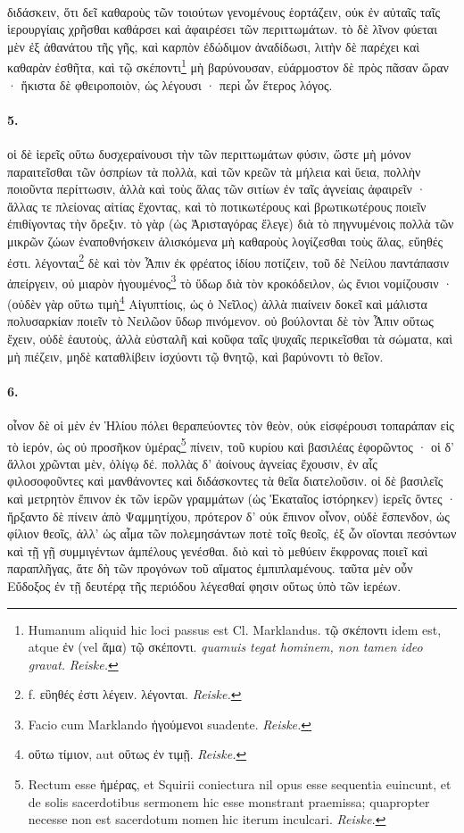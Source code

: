 \documentclass[a4paper, 11pt, oneside, polutonikogreek, german]{article}
\begin{document}
\paragraph{}
διδάσκειν, ὅτι δεῖ καθαροὺς τῶν τοιούτων γενομένους ἑορτάζειν, οὐκ ἐν αὐταῖς ταῖς ἱερουργίαις χρῆσθαι καθάρσει καὶ ἀφαιρέσει τῶν περιττωμάτων. τὸ δὲ λῖνον φύεται μὲν ἐξ ἀθανάτου τῆς γῆς, καὶ καρπὸν ἐδώδιμον ἀναδίδωσι, λιτὴν δὲ παρέχει καὶ καθαρὰν ἐσθῆτα, καὶ τῷ σκέποντι\footnote{Humanum aliquid hic loci passus est Cl. Marklandus. τῷ σκέποντι idem est, atque ἐν (vel ἅμα) τῷ σκέποντι. \emph{quamuis tegat hominem, non tamen ideo gravat.} \emph{Reiske.}} μὴ βαρύνουσαν, εὐάρμοστον δὲ πρὸς πᾶσαν ὥραν · ἥκιστα δὲ φθειροποιὸν, ὡς λέγουσι · περὶ ὧν ἕτερος λόγος.

\paragraph{5.}
οἱ δὲ ἱερεῖς οὕτω δυσχεραίνουσι τὴν τῶν περιττωμάτων φύσιν, ὥστε μὴ μόνον παραιτεῖσθαι τῶν ὀσπρίων τὰ πολλὰ, καὶ τῶν κρεῶν τὰ μήλεια καὶ ὕεια, πολλὴν ποιοῦντα περίττωσιν, ἀλλὰ καὶ τοὺς ἅλας τῶν σιτίων ἐν ταῖς ἁγνείαις ἀφαιρεῖν · ἄλλας τε πλείονας αἰτίας ἔχοντας, καὶ τὸ ποτικωτέρους καὶ βρωτικωτέρους ποιεῖν ἐπιθίγοντας τὴν ὄρεξιν. τὸ γὰρ (ὡς Ἀρισταγόρας ἔλεγε) διὰ τὸ πηγνυμένοις πολλὰ τῶν μικρῶν ζώων ἐναποθνήσκειν ἁλισκόμενα μὴ καθαροὺς λογίζεσθαι τοὺς ἅλας, εὔηθές ἐστι. λέγονται\footnote{f. εὒηθές ἐστι λέγειν. λέγονται. \emph{Reiske.}} δὲ καὶ τὸν Ἆπιν ἐκ φρέατος ἰδίου ποτίζειν, τοῦ δὲ Νείλου παντάπασιν ἀπείργειν, οὐ μιαρὸν ἡγουμένος\footnote{Facio cum Marklando ἡγούμενοι suadente. \emph{Reiske.}} τὸ ὕδωρ διὰ τὸν κροκόδειλον, ὡς ἔνιοι νομίζουσιν · (οὐδὲν γὰρ οὕτω τιμὴ\footnote{οὕτω τίμιον, aut οὕτως ἐν τιμῇ. \emph{Reiske.}} Αἰγυπτίοις, ὡς ὁ Νεῖλος) ἀλλὰ πιαίνειν δοκεῖ καὶ μάλιστα πολυσαρκίαν ποιεῖν τὸ Νειλῶον ὕδωρ πινόμενον. οὐ βούλονται δὲ τὸν Ἆπιν οὕτως ἔχειν, οὐδὲ ἑαυτοὺς, ἀλλὰ εὐσταλῆ καὶ κοῦφα ταῖς ψυχαῖς περικεῖσθαι τὰ σώματα, καὶ μὴ πιέζειν, μηδὲ καταθλίβειν ἰσχύοντι τῷ θνητῷ, καὶ βαρύνοντι τὸ θεῖον.

\paragraph{6.}
οἶνον δὲ οἱ μὲν ἐν Ἡλίου πόλει θεραπεύοντες τὸν θεὸν, οὐκ εἰσφέρουσι τοπαράπαν εἰς τὸ ἱερόν, ὡς οὐ προσῆκον ὑμέρας\footnote{Rectum esse ἡμέρας, et Squirii coniectura nil opus esse sequentia euincunt, et de solis sacerdotibus sermonem hic esse monstrant praemissa; quapropter necesse non est sacerdotum nomen hic iterum inculcari. \emph{Reiske.}} πίνειν, τοῦ κυρίου καὶ βασιλέας ἐφορῶντος · οἱ δ' ἄλλοι χρῶνται μὲν, ὀλίγῳ δέ. πολλὰς δ' ἀοίνους ἁγνείας ἔχουσιν, ἐν αἷς φιλοσοφοῦντες καὶ μανθάνοντες καὶ διδάσκοντες τὰ θεῖα διατελοῦσιν. οἱ δὲ βασιλεῖς καὶ μετρητὸν ἔπινον ἐκ τῶν ἱερῶν γραμμάτων (ὡς Ἑκαταῖος ἱστόρηκεν) ἱερεῖς ὄντες · ἤρξαντο δὲ πίνειν ἀπὸ Ψαμμητίχου, πρότερον δ' οὐκ ἔπινον οἶνον, οὐδὲ ἔσπενδον, ὡς φίλιον θεοῖς, ἀλλ' ὡς αἷμα τῶν πολεμησάντων ποτὲ τοῖς θεοῖς, ἐξ ὧν οἴονται πεσόντων καὶ τῇ γῇ συμμιγέντων ἀμπέλους γενέσθαι. διὸ καὶ τὸ μεθύειν ἔκφρονας ποιεῖ καὶ παραπλῆγας, ἅτε δὴ τῶν προγόνων τοῦ αἵματος ἐμπιπλαμένους. ταῦτα μὲν οὖν Εὔδοξος ἐν τῇ δευτέρᾳ τῆς περιόδου λέγεσθαί φησιν οὕτως ὑπὸ τῶν ἱερέων.
\end{document}
